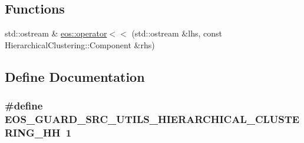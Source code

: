 \subsection*{Functions}
\begin{DoxyCompactItemize}
\item 
std::ostream \& \hyperlink{namespaceeos_a2d7ef50009f9368c73d5056eab3ec21d}{eos::operator$<$$<$} (std::ostream \&lhs, const HierarchicalClustering::Component \&rhs)
\end{DoxyCompactItemize}


\subsection{Define Documentation}
\hypertarget{hierarchical-clustering_8hh_a1d869f2ababc1f554edea4a220d22a62}{
\subsubsection[{EOS\_\-GUARD\_\-SRC\_\-UTILS\_\-HIERARCHICAL\_\-CLUSTERING\_\-HH}]{\setlength{\rightskip}{0pt plus 5cm}\#define EOS\_\-GUARD\_\-SRC\_\-UTILS\_\-HIERARCHICAL\_\-CLUSTERING\_\-HH~1}}
\label{hierarchical-clustering_8hh_a1d869f2ababc1f554edea4a220d22a62}
